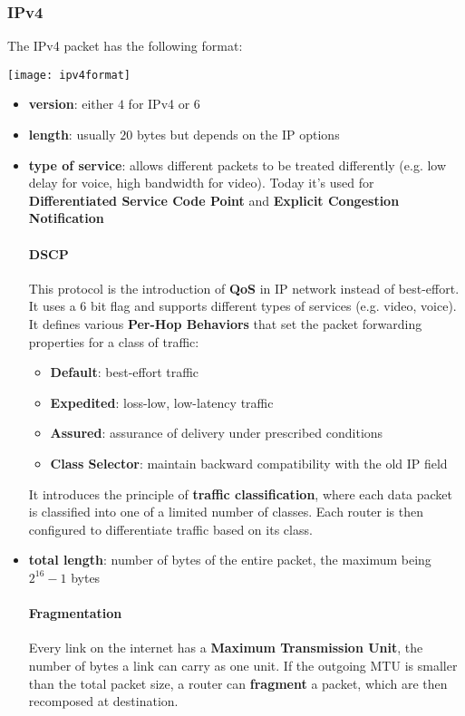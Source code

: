 \subsubsection{IPv4}
The IPv4 packet has the following format:
\begin{center}
	\texttt{[image: ipv4format]}
\end{center}
\begin{itemize}
	\item \textbf{version}: either $4$ for IPv4 or $6$
	\item \textbf{length}: usually $20$ bytes but depends on the IP options
	\item \textbf{type of service}: allows different packets to be treated differently (e.g. low delay for voice, high bandwidth for video). Today it's used for \textbf{Differentiated Service Code Point} and \textbf{Explicit Congestion Notification}
	
	\paragraph{DSCP} This protocol is the introduction of \textbf{QoS} in IP network instead of best-effort. It uses a 6 bit flag and supports different types of services (e.g. video, voice). It defines various \textbf{Per-Hop Behaviors} that set the packet forwarding properties for a class of traffic:
	\begin{itemize}
		\item \textbf{Default}: best-effort traffic
		\item \textbf{Expedited}: loss-low, low-latency traffic
		\item \textbf{Assured}: assurance of delivery under prescribed conditions
		\item \textbf{Class Selector}: maintain backward compatibility with the old IP field
	\end{itemize}
	It introduces the principle of \textbf{traffic classification}, where each data packet is classified into one of a limited number of classes. Each router is then configured to differentiate traffic based on its class.
	
	\item \textbf{total length}: number of bytes of the entire packet, the maximum being $2^{16}-1$ bytes
	
	\paragraph{Fragmentation} Every link on the internet has a \textbf{Maximum Transmission Unit}, the number of bytes a link can carry as one unit. If the outgoing MTU is smaller than the total packet size, a router can \textbf{fragment} a packet, which are then recomposed at destination.
	

\end{itemize}
